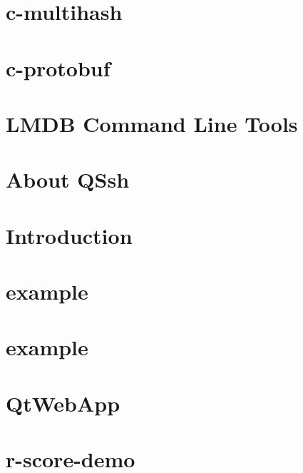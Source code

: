 \documentclass[twoside]{book}
\newcommand{\+}{\discretionary{\mbox{\scriptsize$\hookleftarrow$}}{}{}}
\begin{document}
\chapter{c-\/multihash}
\label{md_prerequisites_c-multihash__r_e_a_d_m_e}

\chapter{c-\/protobuf}
\label{md_prerequisites_c-protobuf__r_e_a_d_m_e}

\chapter{L\+M\+DB Command Line Tools}
\label{tools}

\chapter{About Q\+Ssh}
\label{md_prerequisites_qssh__r_e_a_d_m_e}

\chapter{Introduction}
\label{md_prerequisites__qt_web_app__qt_web_app_qtwebsockets__r_e_a_d_m_e}

\chapter{example}
\label{echoclient}

\chapter{example}
\label{echoserver}

\chapter{Qt\+Web\+App}
\label{md_prerequisites__qt_web_app__r_e_a_d_m_e}

\chapter{r-\/score-\/demo}
\label{md_r-score-demo__r_e_a_d_m_e}

\end{document}
